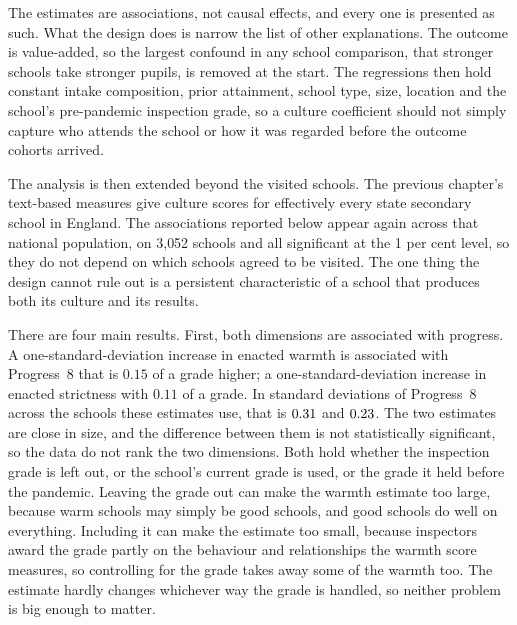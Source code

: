The estimates are associations, not causal effects, and every one is presented as such. What the design does is narrow the list of other explanations. The outcome is value-added, so the largest confound in any school comparison, that stronger schools take stronger pupils, is removed at the start. The regressions then hold constant intake composition, prior attainment, school type, size, location and the school's pre-pandemic inspection grade, so a culture coefficient should not simply capture who attends the school or how it was regarded before the outcome cohorts arrived.

The analysis is then extended beyond the visited schools. The previous chapter's text-based measures give culture scores for effectively every state secondary school in England. The associations reported below appear again across that national population, on 3{,}052 schools and all significant at the 1 per cent level, so they do not depend on which schools agreed to be visited. The one thing the design cannot rule out is a persistent characteristic of a school that produces both its culture and its results.

There are four main results. First, both dimensions are associated with progress. A one-standard-deviation increase in enacted warmth is associated with Progress~8 that is $0.15$ of a grade higher; a one-standard-deviation increase in enacted strictness with $0.11$ of a grade. In standard deviations of Progress~8 across the schools these estimates use, that is $0.31$ and $0.23$. The two estimates are close in size, and the difference between them is not statistically significant, so the data do not rank the two dimensions. Both hold whether the inspection grade is left out, or the school's current grade is used, or the grade it held before the pandemic. Leaving the grade out can make the warmth estimate too large, because warm schools may simply be good schools, and good schools do well on everything. Including it can make the estimate too small, because inspectors award the grade partly on the behaviour and relationships the warmth score measures, so controlling for the grade takes away some of the warmth too. The estimate hardly changes whichever way the grade is handled, so neither problem is big enough to matter.

